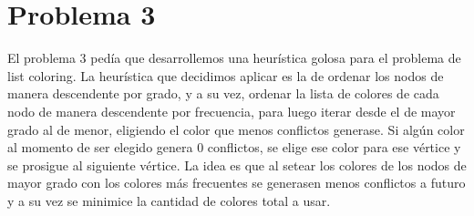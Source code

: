 \documentclass{article}
\theoremstyle{definition}
\theoremstyle{remark}
\begin{document}
\section{Problema 3}

El problema 3 pedía que desarrollemos una heurística golosa para el problema
de list coloring. La heurística que decidimos aplicar es la de ordenar los nodos de manera descendente por grado, y a su vez, ordenar la lista de colores de cada nodo de manera descendente por frecuencia, para luego iterar desde el de mayor grado al de menor, eligiendo el color que menos conflictos generase. Si algún color al momento de ser elegido genera 0 conflictos, se elige ese color para ese vértice y se prosigue al siguiente vértice. 
La idea es que al setear los colores de los nodos de mayor grado con los colores más frecuentes se generasen menos conflictos a futuro y a su vez se minimice la cantidad de colores total a usar.
\end{document}
